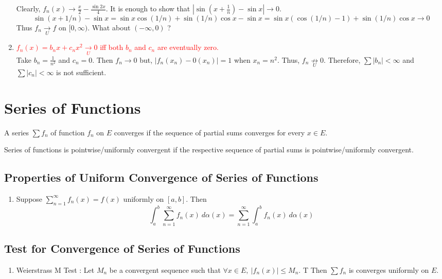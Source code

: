\begin{enumerate}
		Clearly, $f_n(x) \to \frac{x}{2} - \frac{\sin 2x}{4}$. It is enough to show that $|\sin (x+\frac{1}{n}) - \sin x| \to 0$.
		$$\sin (x+1/n) - \sin x = \sin x \cos (1/n) + \sin (1/n) \cos x - \sin x = \sin x (\cos (1/n) - 1) + \sin (1/n) \cos x \to 0$$
		Thus $f_n \underset{U}{\to} f$ on $[0,\infty)$. What about $(-\infty,0)$ ? %
	\item \textcolor{red}{$f_n(x) = b_nx + c_nx^2 \underset{U}{\to} 0$ iff both $b_n$ and $c_n$ are eventually zero.}\\ %
		Take $b_n = \frac{1}{n^2}$ and $c_n = 0$. Then $f_n \to 0$ but, $|f_n(x_n) - 0(x_n)| = 1$ when $x_n = n^2$. Thus, $f_n \underset{U}{\not \to} 0$. Therefore, $\sum |b_n| < \infty$ and $\sum |c_n| < \infty$ is not sufficient.
\end{enumerate}

\section{Series of Functions}
\begin{definition}
	A series $\sum f_n$ of function $f_n$ on $E$ converges if the sequence of partial sums converges for every $x \in E$.
\end{definition}

\begin{definition}
	Series of functions is pointwise/uniformly convergent if the respective sequence of partial sums is pointwise/uniformly convergent.
\end{definition}

\subsection{Properties of Uniform Convergence of Series of Functions}
\begin{enumerate}
	\item Suppose $\sum_{n=1}^\infty f_n(x) = f(x)$ uniformly on $[a,b]$. Then
	$$\int_a^b \sum_{n=1}^\infty f_n(x)\ d\alpha(x) = \sum_{n=1}^\infty \int_a^b f_n(x)\ d\alpha(x)$$
\end{enumerate}

\subsection{Test for Convergence of Series of Functions}
\begin{enumerate}
	\item Weierstrass M Test : Let $M_n$ be a convergent sequence such that $\forall x \in E,\ |f_n(x)| \le M_n$. T
	Then $\sum f_n$ is converges uniformly on $E$.
\end{enumerate}

